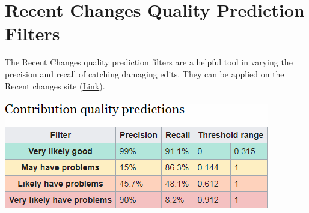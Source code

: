 \documentclass[12pt,a4paper]{article}
\begin{document}
\section{Recent Changes Quality Prediction Filters}
The Recent Changes quality prediction filters are a helpful tool in varying the precision and recall of catching damaging edits. They can be applied on the Recent changes site (\href{https://en.wikipedia.org/wiki/Special:RecentChanges?hidebots=1&hidecategorization=1&hideWikibase=1&limit=50&days=7&urlversion=2}{Link}).\\
\\
\includegraphics[scale=0.85]{resources/6/RCFilters}\\
\end{document}
